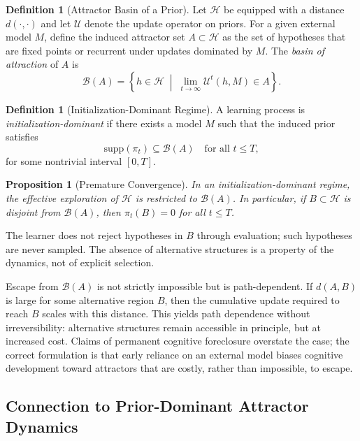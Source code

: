 \documentclass[11pt,a4paper]{article}
\theoremstyle{plain}
\newtheorem{proposition}[theorem]{Proposition}
\theoremstyle{definition}
\newtheorem{definition}[theorem]{Definition}
\theoremstyle{remark}
\begin{document}
\begin{definition}[Attractor Basin of a Prior]
Let $\mathcal{H}$ be equipped with a distance $d(\cdot,\cdot)$ and let
$\mathcal{U}$ denote the update operator on priors. For a given external model
$M$, define the induced attractor set $A \subset \mathcal{H}$ as the set of
hypotheses that are fixed points or recurrent under updates dominated by $M$.
The \emph{basin of attraction} of $A$ is
\[
  \mathcal{B}(A) = \left\{ h \in \mathcal{H}
    \;\middle|\;
    \lim_{t\to\infty} \mathcal{U}^t(h, M) \in A \right\}.
\]
\end{definition}

\begin{definition}[Initialization-Dominant Regime]
A learning process is \emph{initialization-dominant} if there exists a model $M$
such that the induced prior satisfies
\[
  \mathrm{supp}(\pi_t) \subseteq \mathcal{B}(A)
  \quad \text{for all } t \leq T,
\]
for some nontrivial interval $[0,T]$.
\end{definition}

\begin{proposition}[Premature Convergence]
In an initialization-dominant regime, the effective exploration of $\mathcal{H}$
is restricted to $\mathcal{B}(A)$. In particular, if $B \subset \mathcal{H}$ is
disjoint from $\mathcal{B}(A)$, then $\pi_t(B) = 0$ for all $t \leq T$.
\end{proposition}

The learner does not reject hypotheses in $B$ through evaluation; such
hypotheses are never sampled. The absence of alternative structures is a
property of the dynamics, not of explicit selection.

Escape from $\mathcal{B}(A)$ is not strictly impossible but is path-dependent.
If $d(A,B)$ is large for some alternative region $B$, then the cumulative update
required to reach $B$ scales with this distance. This yields path dependence
without irreversibility: alternative structures remain accessible in principle,
but at increased cost. Claims of permanent cognitive foreclosure overstate the
case; the correct formulation is that early reliance on an external model biases
cognitive development toward attractors that are costly, rather than impossible,
to escape.

\subsection{Connection to Prior-Dominant Attractor Dynamics}
\end{document}
